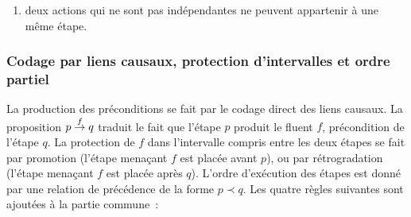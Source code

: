 {\begin{enumerate}
\item {} deux actions qui ne sont pas indépendantes ne peuvent appartenir à une même étape.
\end{enumerate}

\subsubsection{Codage par liens causaux, protection d'intervalles et ordre partiel}

La production des préconditions se fait par le codage direct des liens causaux.
La proposition $p \stackrel{f}{\to} q$ traduit le fait que l'étape $p$ produit le fluent
$f$, précondition de l'étape $q$. La protection de $f$ dans l'intervalle compris
entre les deux étapes se fait par promotion (l'étape menaçant $f$ est placée
avant $p$), ou par rétrogradation (l'étape menaçant $f$ est placée après $q$).
L'ordre d'exécution des étapes  est donné par une relation de précédence de
la forme $p \prec q$. Les quatre règles suivantes sont ajoutées à la partie commune~:

}
